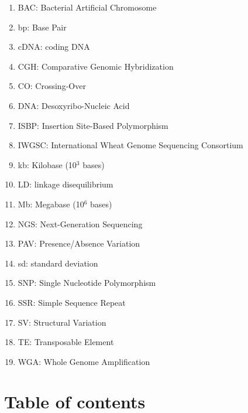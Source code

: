 \documentclass[a4paper, 12pt]{article}
\newcommand{\nocontentsline}[3]{}
\newcommand{\tocless}[2]{\bgroup\let\addcontentsline=\nocontentsline#1{#2}\egroup}
\begin{document}
\begin{onehalfspace}
\vspace{0.5cm}

\begin{enumerate}
\setlength{\itemsep}{1pt}
\item[~] BAC: Bacterial Artificial Chromosome
\item[~] bp: Base Pair
\item[~] cDNA: coding DNA
\item[~] CGH: Comparative Genomic Hybridization
\item[~] CO: Crossing-Over
\item[~] DNA: Desoxyribo-Nucleic Acid
\item[~] ISBP: Insertion Site-Based Polymorphism
\item[~] IWGSC: International Wheat Genome Sequencing Consortium
\item[~] kb: Kilobase (10$^{3}$ bases)
\item[~] LD: linkage disequilibrium
\item[~] Mb: Megabase (10$^{6}$ bases)
\item[~] NGS: Next-Generation Sequencing
\item[~] PAV: Presence/Absence Variation
\item[~] sd: standard deviation
\item[~] SNP: Single Nucleotide Polymorphism
\item[~] SSR: Simple Sequence Repeat
\item[~] SV: Structural Variation
\item[~] TE: Transposable Element
\item[~] WGA: Whole Genome Amplification
\end{enumerate}


\newpage
\pagestyle{empty}
\parindent=1.5cm
\tocless{\part*{Table of contents}} 
{\setlength{\baselineskip}{0.90\baselineskip} %
\tableofcontents\par}


\newpage
\pagestyle{empty}
\parindent=1.5cm
\tocless{\part*{Table of figures}}
\listoffigures



\end{onehalfspace}
\end{document}
